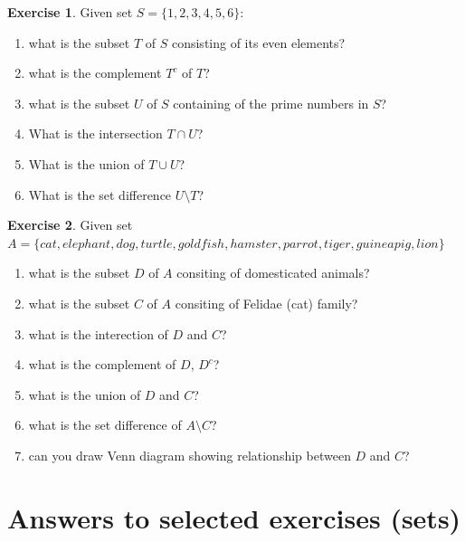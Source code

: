 \documentclass[
]{book}
\providecommand{\tightlist}{%
  \setlength{\itemsep}{0pt}\setlength{\parskip}{0pt}}
\theoremstyle{definition}
\theoremstyle{definition}
\theoremstyle{definition}
\newtheorem{exercise}{Exercise}[chapter]
\theoremstyle{remark}
\begin{document}
\begin{exercise}
\protect\hypertarget{exr:m-sets-01}{}{\label{exr:m-sets-01} }
Given set \(S = \{1, 2, 3, 4, 5, 6\}\):

\begin{enumerate}
\def\labelenumi{\alph{enumi})}
\tightlist
\item
  what is the subset \(T\) of \(S\) consisting of its even elements?
\item
  what is the complement \(T^c\) of \(T\)?
\item
  what is the subset \(U\) of \(S\) containing of the prime numbers in \(S\)?
\item
  What is the intersection \(T \cap U\)?
\item
  What is the union of \(T \cup U\)?
\item
  What is the set difference \(U \setminus T\)?
\end{enumerate}
\end{exercise}

\begin{exercise}
\protect\hypertarget{exr:m-sets-02}{}{\label{exr:m-sets-02} }
Given set \(A = \{cat, elephant, dog, turtle, goldfish, hamster, parrot, tiger, guinea pig, lion\}\)

\begin{enumerate}
\def\labelenumi{\alph{enumi})}
\tightlist
\item
  what is the subset \(D\) of \(A\) consiting of domesticated animals?
\item
  what is the subset \(C\) of \(A\) consiting of Felidae (cat) family?
\item
  what is the interection of \(D\) and \(C\)?
\item
  what is the complement of \(D\), \(D^c\)?
\item
  what is the union of \(D\) and \(C\)?
\item
  what is the set difference of \(A \setminus C\)?
\item
  can you draw Venn diagram showing relationship between \(D\) and \(C\)?
\end{enumerate}
\end{exercise}

\hypertarget{answers-to-selected-exercises-sets}{%
\section*{Answers to selected exercises (sets)}\label{answers-to-selected-exercises-sets}}
\end{document}
